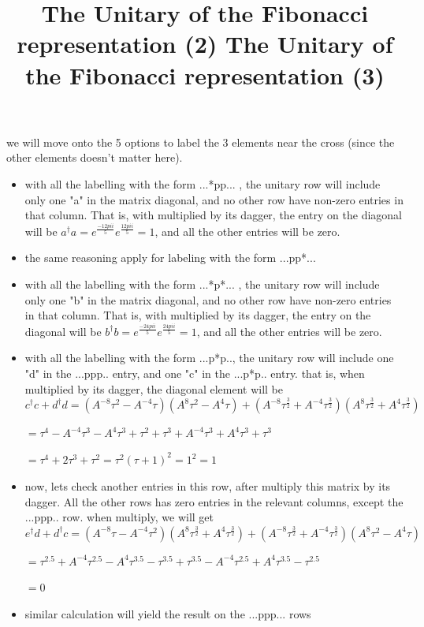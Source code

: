\documentclass{article}
\begin{document}
we will move onto the 5 options to label the 3 elements near the cross (since the other elements doesn't matter here).
\begin{itemize}
\item with all the labelling with the form ...*pp... , the unitary row will include only one "a" in the matrix diagonal, and no other row have non-zero entries in that column. That is, with multiplied by its dagger, the entry on the diagonal will be $a^{\dagger}a = e^{\frac{-12{pi}i}{5}}e^{\frac{12{pi}i}{5}} = 1$, and all the other entries will be zero.
\item the same reasoning apply for labeling with the form ...pp*...  
\end{itemize}


\title{The Unitary of the Fibonacci representation (2) }
\begin{itemize}
\item with all the labelling with the form ...*p*... , the unitary row will include only one "b" in the matrix diagonal, and no other row have non-zero entries in that column. That is, with multiplied by its dagger, the entry on the diagonal will be $b^{\dagger}b = e^{\frac{-24{pi}i}{5}}e^{\frac{24{pi}i}{5}} = 1$, and all the other entries will be zero.
\item  with all the labelling with the form ...p*p.., the unitary row will include one "d" in the ...ppp.. entry, and one "c" in the ...p*p.. entry. that is, when multiplied by its dagger, the diagonal element will be $c^{\dagger}c + d^{\dagger}d = (A^{-8}\tau^{2} - A^{-4}\tau)(A^{8}\tau^{2} - A^{4}\tau) + (A^{-8}\tau^{\frac{3}{2}} + A^{-4}\tau^{\frac{3}{2}})(A^{8}\tau^{\frac{3}{2}} + A^{4}\tau^{\frac{3}{2}})$

$ = \tau^{4} - A^{-4}\tau^{3} - A^{4}\tau^{3} + \tau^{2} + \tau^{3} + A^{-4}\tau^{3} + A^{4}\tau^{3} + \tau^{3}$

$ = \tau^{4} + 2\tau^{3} + \tau^{2} = {\tau^{2}(\tau+1)}^{2} = 1^{2} = 1$ 
\end{itemize}


\title{The Unitary of the Fibonacci representation (3) }
\begin{itemize}
\item  now, lets check another entries in this row, after multiply this matrix by its dagger.
All the other rows has zero entries in the relevant columns, except the ...ppp.. row. when multiply, we will get $e^{\dagger}d + d^{\dagger}c = (A^{-8}\tau - A^{-4}\tau^{2})(A^{8}\tau^{\frac{3}{2}} + A^{4}\tau^{\frac{3}{2}}) + (A^{-8}\tau^{\frac{3}{2}} + A^{-4}\tau^{\frac{3}{2}})(A^{8}\tau^{2} - A^{4}\tau)$

$ = \tau^{2.5} + A^{-4}\tau^{2.5} - A^{4}\tau^{3.5} - \tau^{3.5} + \tau^{3.5} - A^{-4}\tau^{2.5} + A^{4}\tau^{3.5} - \tau^{2.5}$

$ = 0$
\item similar calculation will yield the result on the ...ppp... rows   
\end{itemize}
\end{document}

